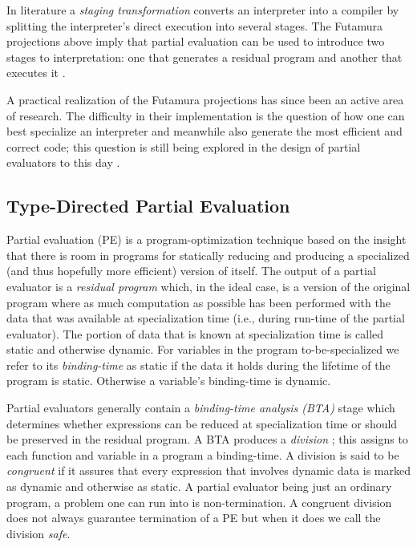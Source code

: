 \documentclass[a4paper,12pt,twoside,openright]{report}
\theoremstyle{definition}
\begin{document}
In literature a \textit{staging transformation} \cite{jorring1986compilers,brady2006verified}  converts an interpreter into a compiler by splitting the interpreter's direct execution into several stages. The Futamura projections above imply that partial evaluation can be used to introduce two stages to interpretation: one that generates a residual program and another that executes it \cite{jones1993partial}.

A practical realization of the Futamura projections has since been an active area of research. The difficulty in their implementation is the question of how one can best specialize an interpreter and meanwhile also generate the most efficient and correct code; this question is still being explored in the design of partial evaluators to this day \cite{jones1988challenging,jones1993partial}.

\subsection{Type-Directed Partial Evaluation}\label{subsec:tdpe}
Partial evaluation (PE) is a program-optimization technique based on the insight that there is room in programs for statically reducing and producing a specialized (and thus hopefully more efficient) version of itself. The output of a partial evaluator is a \textit{residual program} which, in the ideal case, is a version of the original program where as much computation as possible has been performed with the data that was available at specialization time (i.e., during run-time of the partial evaluator). The portion of data that is known at specialization time is called static and otherwise dynamic. For variables in the program to-be-specialized we refer to its \textit{binding-time} as static if the data it holds during the lifetime of the program is static. Otherwise a variable's binding-time is dynamic.

Partial evaluators generally contain a \textit{binding-time analysis (BTA)} stage which determines whether expressions can be reduced at specialization time or should be preserved in the residual program. A BTA produces a \textit{division} \cite{jones1993partial}; this assigns to each function and variable in a program a binding-time. A division is said to be \textit{congruent} if it assures that every expression that involves dynamic data is marked as dynamic and otherwise as static. A partial evaluator being just an ordinary program, a problem one can run into is non-termination. A congruent division does not always guarantee termination of a PE but when it does we call the division \textit{safe}.
\end{document}
